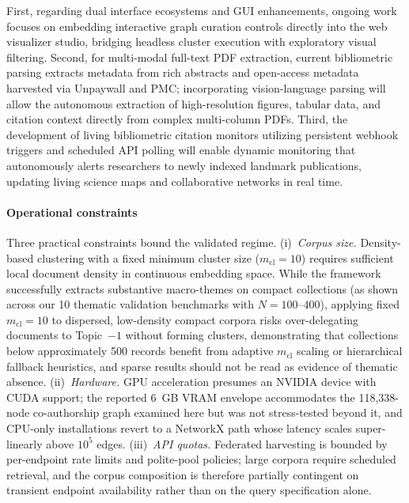 \documentclass[preprint,12pt]{elsarticle}
\begin{document}
First, regarding dual interface ecosystems and GUI enhancements, ongoing work focuses on embedding interactive graph curation controls directly into the web visualizer studio, bridging headless cluster execution with exploratory visual filtering. Second, for multi-modal full-text PDF extraction, current bibliometric parsing extracts metadata from rich abstracts and open-access metadata harvested via Unpaywall and PMC; incorporating vision-language parsing will allow the autonomous extraction of high-resolution figures, tabular data, and citation context directly from complex multi-column PDFs. Third, the development of living bibliometric citation monitors utilizing persistent webhook triggers and scheduled API polling will enable dynamic monitoring that autonomously alerts researchers to newly indexed landmark publications, updating living science maps and collaborative networks in real time.

\paragraph{Operational constraints}
Three practical constraints bound the validated regime. (i)~\emph{Corpus size.} Density-based clustering with a fixed minimum cluster size ($m_{\text{cl}} = 10$) requires sufficient local document density in continuous embedding space. While the framework successfully extracts substantive macro-themes on compact collections (as shown across our 10 thematic validation benchmarks with $N = 100\text{--}400$), applying fixed $m_{\text{cl}} = 10$ to dispersed, low-density compact corpora risks over-delegating documents to Topic~$-1$ without forming clusters, demonstrating that collections below approximately 500 records benefit from adaptive $m_{\text{cl}}$ scaling or hierarchical fallback heuristics, and sparse results should not be read as evidence of thematic absence. (ii)~\emph{Hardware.} GPU acceleration presumes an NVIDIA device with CUDA support; the reported 6~GB VRAM envelope accommodates the 118{,}338-node co-authorship graph examined here but was not stress-tested beyond it, and CPU-only installations revert to a NetworkX path whose latency scales super-linearly above $10^5$ edges. (iii)~\emph{API quotas.} Federated harvesting is bounded by per-endpoint rate limits and polite-pool policies; large corpora require scheduled retrieval, and the corpus composition is therefore partially contingent on transient endpoint availability rather than on the query specification alone.
\end{document}
